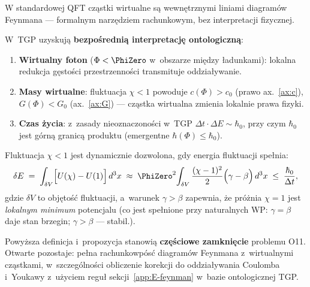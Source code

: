 \begin{remark}
\label{rem:virtual-comparison}
W standardowej QFT cz\k{a}stki wirtualne s\k{a} wewn\k{e}trznymi
liniami diagram\'ow Feynmana --- formalnym narz\k{e}dziem
rachunkowym, bez interpretacji fizycznej.

W~TGP uzyskuj\k{a} \textbf{bezpo\'sredni\k{a} interpretacj\k{e} ontologiczn\k{a}}:
\begin{enumerate}[nosep]
    \item \textbf{Wirtualny foton} ($\Phi < \PhiZero$ w~obszarze
          mi\k{e}dzy \l{}adunkami): lokalna redukcja g\k{e}sto\'sci
          przestrzenno\'sci transmituje oddzia\l{}ywanie.
    \item \textbf{Masy wirtualne}: fluktuacja $\chi < 1$ powoduje
          $c(\Phi) > c_0$ (prawo ax.~\ref{ax:c}),
          $G(\Phi) < G_0$ (ax.~\ref{ax:G}) ---
          cz\k{a}stka wirtualna zmienia lokalnie prawa fizyki.
    \item \textbf{Czas \.zycia}: z~zasady nieoznaczono\'sci w~TGP
          $\Delta t \cdot \Delta E \sim \hbar_0$,
          przy czym $\hbar_0$ jest g\'orn\k{a} granic\k{a} produktu
          (emergentne $\hbar(\Phi) \leq \hbar_0$).
\end{enumerate}
\end{remark}

\begin{proposition}\label{prop:virtual-existence}
Fluktuacja $\chi < 1$ jest dynamicznie dozwolona,
gdy energia fluktuacji spe\l{}nia:
\begin{equation}\label{eq:virtual-energy}
    \delta E \;=\; \int_{\delta V}
    \Bigl[U(\chi) - U(1)\Bigr]\,d^3x
    \;\approx\; \PhiZero^2\!\int_{\delta V}
    \frac{(\chi-1)^2}{2}\Bigl(\gamma - \beta\Bigr)\,d^3x
    \;\leq\; \frac{\hbar_0}{\Delta t},
\end{equation}
gdzie $\delta V$ to obj\k{e}to\'s\'c fluktuacji,
a~warunek $\gamma > \beta$ zapewnia,
\.ze pr\'o\.znia $\chi=1$ jest \emph{lokalnym minimum} potencjalu
(co jest spe\l{}nione przy naturalnych WP:
$\gamma = \beta$ daje stan brzegin; $\gamma > \beta$ --- stabil.).
\end{proposition}

\begin{remark}[Status O11]
Powy\.zsza definicja i~propozycja stanowi\k{a} \textbf{cz\k{e}\'sciowe zamkni\k{e}cie}
problemu O11.
Otwarte pozostaje: pe\l{}na rachunkowp\'os\'c diagram\'ow Feynmana
z~wirtualnymi cz\k{a}stkami, w~szczeg\'olno\'sci obliczenie
korekcji do oddzia\l{}ywania Coulomba i~Youkawy z~u\.zyciem
regu\l{} sekcji~\ref{app:E-feynman}
w~bazie ontologicznej TGP.
\end{remark}


